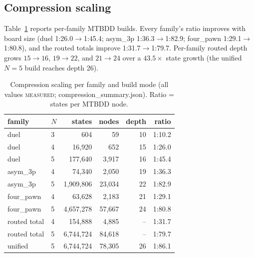 \documentclass[conference]{IEEEtran}
\newcommand{\tierm}{\textsc{measured}}
\begin{document}
\subsection{Compression scaling}
Table~\ref{tab:compression} reports per-family MTBDD builds. Every family's
ratio improves with board size (duel 1:26.0$\to$1:45.4; asym\_3p
1:36.3$\to$1:82.9; four\_pawn 1:29.1$\to$1:80.8), and the routed totals
improve 1:31.7$\to$1:79.7. Per-family routed depth grows $15{\to}16$,
$19{\to}22$, and $21{\to}24$ over a $43.5\times$ state growth (the unified
$N{=}5$ build reaches depth 26).

\begin{table}[t]
\caption{Compression scaling per family and build mode (all values
\tierm{}; compression\_summary.json). Ratio = states per MTBDD node.}
\label{tab:compression}
\centering
\footnotesize
\begin{tabular}{llrrrr}
\toprule
family & $N$ & states & nodes & depth & ratio \\
\midrule
duel       & 3 & 604 & 59 & 10 & 1:10.2 \\
duel       & 4 & 16{,}920 & 652 & 15 & 1:26.0 \\
duel       & 5 & 177{,}640 & 3{,}917 & 16 & 1:45.4 \\
asym\_3p   & 4 & 74{,}340 & 2{,}050 & 19 & 1:36.3 \\
asym\_3p   & 5 & 1{,}909{,}806 & 23{,}034 & 22 & 1:82.9 \\
four\_pawn & 4 & 63{,}628 & 2{,}183 & 21 & 1:29.1 \\
four\_pawn & 5 & 4{,}657{,}278 & 57{,}667 & 24 & 1:80.8 \\
\midrule
routed total & 4 & 154{,}888 & 4{,}885 & -- & 1:31.7 \\
routed total & 5 & 6{,}744{,}724 & 84{,}618 & -- & 1:79.7 \\
unified      & 5 & 6{,}744{,}724 & 78{,}305 & 26 & 1:86.1 \\
\bottomrule
\end{tabular}
\end{table}
\end{document}
